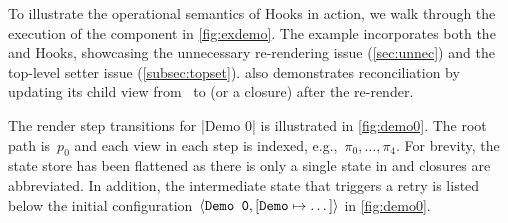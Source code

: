 To illustrate the operational semantics of Hooks in action, we walk through the execution of the  component in \cref{fig:exdemo}.
The example incorporates both the  and  Hooks, showcasing the unnecessary re-rendering issue (\cref{sec:unnec}) and the top-level setter issue (\cref{subsec:topset}).
 also demonstrates reconciliation by updating its child view from~\reacttt{()} to  (or a closure) after the re-render.

The render step transitions for |Demo 0| is illustrated in \cref{fig:demo0}.
The root path is~$p_0$ and each view in each step is indexed, e.g.,~$\pi_0, \dots, \pi_4$.
For brevity, the state store has been flattened as there is only a single state in  and closures are abbreviated.
In addition, the intermediate state that triggers a retry is listed below the initial configuration~$\langle\texttt{Demo 0}, [\texttt{Demo} \mapsto \dots]\rangle$ in \cref{fig:demo0}.
\begin{figure}[t]
  \centering
\end{figure}

